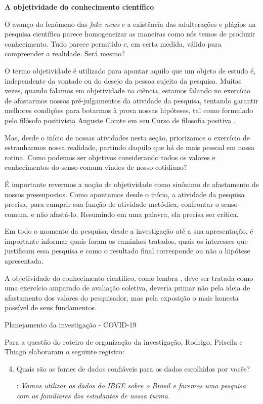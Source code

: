 \begin{reflection}
\textbf{A objetividade do conhecimento científico}

O avanço do fenômeno das \textit{fake news} e a existência das adulterações e plágios na pesquisa científica parece homogeneizar as maneiras como nós temos de produzir conhecimento. Tudo parece permitido e, em certa medida, válido para compreender a realidade. Será mesmo?

O termo objetividade é utilizado para apontar aquilo que um objeto de estudo é, independente da vontade ou do desejo da pessoa sujeito da pesquisa. Muitas vezes, quando falamos em objetividade na ciência, estamos falando no exercício de afastarmos nossos pré-julgamentos da atividade da pesquisa, tentando garantir melhores condições para botarmos à prova nossas hipóteses, tal como formulado pelo filósofo positivista Auguste Comte em seu Curso de filosofia positiva \citep{comte1996}.

Mas, desde o início de nossas atividades nesta seção, priorizamos o exercício de estranharmos nossa realidade, partindo daquilo que há de mais pessoal em nossa rotina. Como podemos ser objetivos considerando todos os valores e conhecimentos do senso-comum vindos de nosso cotidiano?

É importante revermos a noção de objetividade como sinônimo de afastamento de nossos pressupostos. Como apontamos desde o início, a atividade da pesquisa precisa, para cumprir sua função de atividade metódica, confrontar o senso-comum, e não afastá-lo. Resumindo em uma palavra, ela precisa ser crítica.

Em todo o momento da pesquisa, desde a investigação até a sua apresentação, é importante informar quais foram os caminhos tratados, quais os interesses que justificam essa pesquisa e como o resultado final corresponde ou não a hipótese apresentada.

A objetividade do conhecimento científico, como lembra \citet{bunge2016}, deve ser tratada como uma exercício amparado de avaliação coletiva, deveria primar não pela ideia de afastamento dos valores do pesquisador, mas pela exposição o mais honesta possível de seus fundamentos.

\end{reflection}

\begin{example}{Planejamento da investigação - COVID-19}

Para a questão  do roteiro de organização da investigação, Rodrigo, Priscila e Thiago elaboraram o seguinte registro:

\begin{enumerate}[label=\titem{\arabic*)}]\setcounter{enumi}{3}
\item Quais são as fontes de dados confiáveis para os dados escolhidos por vocês?

: \textit{Vamos utilizar os dados do IBGE sobre o Brasil e faremos uma pesquisa com os familiares dos estudantes de nossa turma. }
\end{enumerate}
\end{example}

